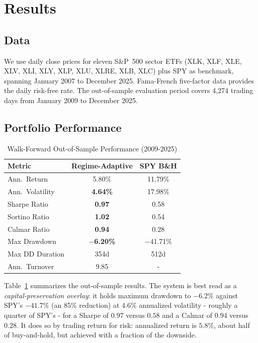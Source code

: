 \documentclass[11pt]{article}
\begin{document}
\section{Results}

\subsection{Data}

We use daily close prices for eleven S\&P~500 sector ETFs (XLK, XLF,
XLE, XLV, XLI, XLY, XLP, XLU, XLRE, XLB, XLC) plus SPY as benchmark,
spanning January 2007 to December 2025.  Fama-French five-factor
data \citep{fama2015} provides the daily risk-free rate.  The
out-of-sample evaluation period covers 4{,}274 trading days from
January 2009 to December 2025.

\subsection{Portfolio Performance}

\begin{table}[H]
\caption{Walk-Forward Out-of-Sample Performance (2009-2025)}
\label{tab:performance}
\centering
\begin{tabular}{lcc}
\toprule
\textbf{Metric}     & \textbf{Regime-Adaptive} & \textbf{SPY B\&H} \\
\midrule
Ann.\ Return        & 5.80\%             & 11.79\%   \\
Ann.\ Volatility    & \textbf{4.64\%}    & 17.98\%   \\
Sharpe Ratio        & \textbf{0.97}      & 0.58      \\
Sortino Ratio       & \textbf{1.02}      & 0.54      \\
Calmar Ratio        & \textbf{0.94}      & 0.28      \\
Max Drawdown        & \textbf{$-$6.20\%} & $-$41.71\%\\
Max DD Duration     & 354d               & 512d      \\
Ann.\ Turnover      & 9.85               & -       \\
\bottomrule
\end{tabular}
\end{table}

Table~\ref{tab:performance} summarizes the out-of-sample results. The
system is best read as a \emph{capital-preservation overlay}: it holds
maximum drawdown to $-6.2\%$ against SPY's $-41.7\%$ (an 85\% reduction)
at $4.6\%$ annualized volatility - roughly a quarter of SPY's - for a
Sharpe of $0.97$ versus $0.58$ and a Calmar of $0.94$ versus $0.28$.
It does so by trading return for risk: annualized return is $5.8\%$,
about half of buy-and-hold, but achieved with a fraction of the
downside.
\end{document}
